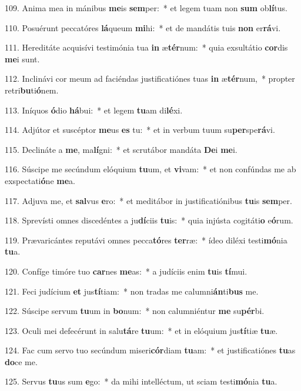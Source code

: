 109. Anima mea in mánibus \textbf{me}is \textbf{sem}per:~*  et legem tuam non \textbf{sum} ob\textbf{lí}tus.\

110. Posuérunt peccatóres \textbf{lá}queum \textbf{mi}hi:~*  et de mandátis tuis \textbf{non} er\textbf{rá}vi.\

111. Hereditáte acquisívi testimónia tua \textbf{in} æ\textbf{tér}num:~*  quia exsultátio \textbf{cor}dis \textbf{me}i sunt.\

112. Inclinávi cor meum ad faciéndas justificatiónes tuas \textbf{in} æ\textbf{tér}num,~*  propter retri\textbf{bu}ti\textbf{ó}nem.\

113. Iníquos \textbf{ó}dio \textbf{há}bui:~*  et legem \textbf{tu}am di\textbf{lé}xi.\

114. Adjútor et suscéptor \textbf{me}us \textbf{es} tu:~*  et in verbum tuum su\textbf{per}spe\textbf{rá}vi.\

115. Declináte a \textbf{me}, ma\textbf{lí}gni:~*  et scrutábor mandáta \textbf{De}i \textbf{me}i.\

116. Súscipe me secúndum elóquium \textbf{tu}um, et \textbf{vi}vam:~*  et non confúndas me ab exspectati\textbf{ó}ne \textbf{me}a.\

117. Adjuva me, et \textbf{sal}vus \textbf{e}ro:~*  et meditábor in justificatiónibus \textbf{tu}is \textbf{sem}per.\

118. Sprevísti omnes discedéntes a ju\textbf{dí}ciis \textbf{tu}is:~*  quia injústa cogitáti\textbf{o} e\textbf{ó}rum.\

119. Prævaricántes reputávi omnes pecca\textbf{tó}res \textbf{ter}ræ:~*  ídeo diléxi testi\textbf{mó}nia \textbf{tu}a.\

120. Confíge timóre tuo \textbf{car}nes \textbf{me}as:~*  a judíciis enim \textbf{tu}is \textbf{tí}mui.\

121. Feci judícium \textbf{et} jus\textbf{tí}tiam:~*  non tradas me calumni\textbf{án}ti\textbf{bus} me.\

122. Súscipe servum \textbf{tu}um in \textbf{bo}num:~*  non calumniéntur \textbf{me} su\textbf{pér}bi.\

123. Oculi mei defecérunt in salu\textbf{tá}re \textbf{tu}um:~*  et in elóquium jus\textbf{tí}tiæ \textbf{tu}æ.\

124. Fac cum servo tuo secúndum miseri\textbf{cór}diam \textbf{tu}am:~*  et justificatiónes \textbf{tu}as \textbf{do}ce me.\

125. Servus \textbf{tu}us sum \textbf{e}go:~*  da mihi intelléctum, ut sciam testi\textbf{mó}nia \textbf{tu}a.\

